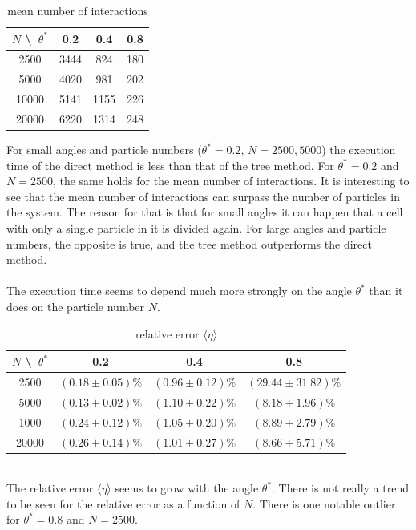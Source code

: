     \begin{table}[h!]
        \begin{center}
        \caption{mean number of interactions}
        \begin{tabular}{c | c | c | c}
            $N$ \textbackslash\ $\theta^*$ & 0.2  & 0.4  & 0.8 \\
            \hline
            2500  & 3444 & 824  & 180 \\
            \hline
            5000  & 4020 & 981  & 202 \\
            \hline
            10000 & 5141 & 1155 & 226 \\
            \hline
            20000 & 6220 & 1314 & 248 \\
        \end{tabular}
        \end{center}
    \end{table} 
    For small angles and particle numbers 
    ($\theta^*=0.2$, $N=2500,5000$) the execution time 
    of the direct method is less than that of the tree 
    method. For $\theta^*=0.2$ and $N=2500$,
    the same holds for the mean number of interactions.
    It is interesting to see that the mean number of 
    interactions can surpass the number of particles 
    in the system. The reason for that is that for 
    small angles it can happen that a cell with only a 
    single particle in it is divided again. For large 
    angles and particle numbers, the opposite is true, 
    and the tree method outperforms the direct method.  \\
    \\
    The execution time seems to depend much more 
    strongly on the angle $\theta^*$ than it does on 
    the particle number $N$. 
    \begin{table}[h!]
        \begin{center}
            \caption{relative error $\langle\eta\rangle$}
            \begin{tabular}{c | c | c | c}
                $N$ \textbackslash\ $\theta^*$ & 0.2 & 0.4 & 0.8 \\
                \hline
                2500  & $(0.18\pm0.05)\%$ & $(0.96\pm0.12)\%$ & $(29.44\pm31.82)\%$ \\
                \hline
                5000  & $(0.13\pm0.02)\%$ & $(1.10\pm0.22)\%$ & $(8.18\pm1.96)\%$ \\
                \hline
                1000  & $(0.24\pm0.12)\%$ & $(1.05\pm0.20)\%$ & $(8.89\pm2.79)\%$ \\
                \hline
                20000 & $(0.26\pm0.14)\%$ & $(1.01\pm0.27)\%$ & $(8.66\pm5.71)\%$ \\
            \end{tabular}
        \end{center}
    \end{table} \ \\ 
    The relative error $\langle\eta\rangle$ seems to 
    grow with the angle $\theta^*$. There is not 
    really a trend to be seen for the relative error
    as a function of $N$. There is one notable
    outlier for $\theta^*=0.8$ and $N=2500$.

